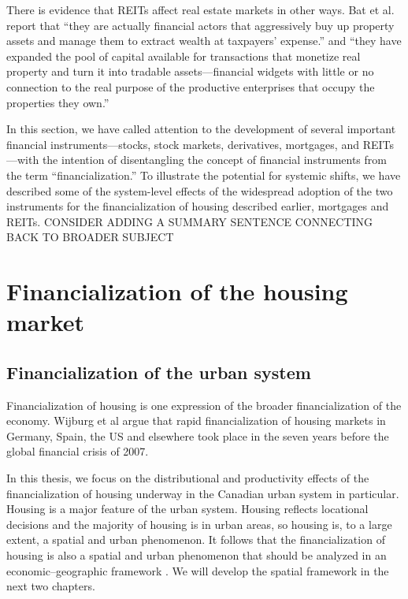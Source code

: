 There is evidence that REITs affect real estate markets in other ways. Bat et al.  \cite{batRolePublicREITs2022} report that  ``they are actually financial actors that aggressively buy up property assets and manage them to extract wealth at taxpayers' expense.'' and ``they have expanded the pool of capital available for transactions that monetize real property and turn it into tradable assets---financial widgets with little or no connection to the real purpose of the productive enterprises that occupy the properties they own.''

In this section, we have called attention to the development of several important financial instruments---stocks, stock markets, derivatives, mortgages, and REITs---with the intention of  disentangling the concept of financial instruments from the term ``financialization.'' %
To illustrate the potential for systemic shifts, we have described some of the system-level effects of the widespread adoption of the two instruments for the financialization of housing described earlier, mortgages and REITs. {\color{red} CONSIDER ADDING A SUMMARY SENTENCE CONNECTING BACK TO BROADER SUBJECT}

\section{Financialization of the housing market}
\subsection{Financialization of the urban system } 



Financialization of housing %
is one expression of the broader financialization of the economy. Wijburg et al \cite{wijburgFinancialisationRentalHousing2018} argue that rapid financialization of housing markets in Germany, Spain, the US and elsewhere  took place in the seven years before the global financial crisis  of 2007. 

In this thesis, we focus on the distributional and productivity effects of the financialization of housing underway in the Canadian urban system in particular. Housing is a major feature of the urban system.  Housing reflects locational decisions and the majority of housing is in urban areas, so housing is, to a large extent, a spatial and urban phenomenon. It follows that the financialization of housing is also a spatial and urban phenomenon that should be analyzed in an economic–geographic framework \cite{aalbersPotentialFinancialization2015}. We will develop the spatial framework in the next two chapters. 

